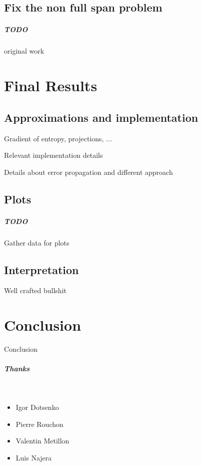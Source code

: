 \documentclass[10pt]{report}
\begin{document}
\section{Fix the non full span problem}

\paragraph{TODO} original work

\chapter{Final Results}

\section{Approximations and implementation}

Gradient of entropy, projections, ...

Relevant implementation details

Details about error propagation and different approach

\section{Plots}

\paragraph{TODO} Gather data for plots

\section{Interpretation}

Well crafted bullshit

\chapter*{Conclusion} %

Conclusion



\vfill

\paragraph{\Huge Thanks}

\

\vspace{3mm}

\begin{itemize}

\item Igor Dotsenko
\item Pierre Rouchon
\item Valentin Metillon
\item Luis Najera

\end{itemize}

\vfill






{\let\clearpage\relax }
\end{document}

